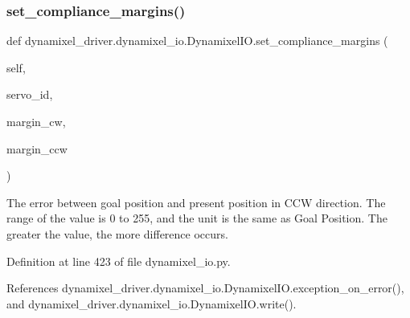 \subsubsection{\texorpdfstring{set\+\_\+compliance\+\_\+margins()}{set\_compliance\_margins()}}
{\footnotesize\ttfamily def dynamixel\+\_\+driver.\+dynamixel\+\_\+io.\+Dynamixel\+I\+O.\+set\+\_\+compliance\+\_\+margins (\begin{DoxyParamCaption}\item[{}]{self,  }\item[{}]{servo\+\_\+id,  }\item[{}]{margin\+\_\+cw,  }\item[{}]{margin\+\_\+ccw }\end{DoxyParamCaption})}

\begin{DoxyVerb}The error between goal position and present position in CCW direction.
The range of the value is 0 to 255, and the unit is the same as Goal Position.
The greater the value, the more difference occurs.
\end{DoxyVerb}
 

Definition at line 423 of file dynamixel\+\_\+io.\+py.



References dynamixel\+\_\+driver.\+dynamixel\+\_\+io.\+Dynamixel\+I\+O.\+exception\+\_\+on\+\_\+error(), and dynamixel\+\_\+driver.\+dynamixel\+\_\+io.\+Dynamixel\+I\+O.\+write().


